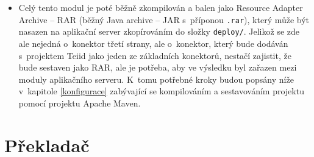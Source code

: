 \documentclass[oneside,12pt]{fithesis2}
\begin{document}
\begin{itemize}
 \texttt{MANIFEST.MF} obsahuje pouze závislosti resource adapteru. V~případě našeho konkrétního adapteru je to:
 \begin{Verbatim}[fontsize=\small]
Dependencies: org.jboss.teiid.common-core,
	    org.jboss.teiid.api,javax.api,
	    org.jboss.teiid.translator.simpledb.api
 \end{Verbatim}
 
 V~deployment descriptoru \texttt{ra.xml} definujeme hlavní třídu resource adapteru (tj. třída implementující rozhraní \texttt{Resource Adapter}), třídu implementující rozhraní \texttt{ManagedConnection\allowbreak Factory} a definujeme proměnné potřebné k~připojení k~SimpleDB (ID přístupového klíče a tajný klíč). 
 
 \item Celý tento modul je poté běžně zkompilován a balen jako Resource Adapter Archive -- RAR (běžný Java archive -- JAR s~příponou \texttt{.rar}), který může být nasazen na aplikační server zkopírováním do složky \texttt{deploy/}. Jelikož se zde ale nejedná o~konektor třetí strany, ale o~konektor, který bude dodáván s~projektem Teiid jako jeden ze základních konektorů, nestačí zajistit, že bude sestaven jako RAR, ale je potřeba, aby ve výsledku byl zařazen mezi moduly aplikačního serveru. K~tomu potřebné kroky budou popsány níže v~kapitole \ref{konfigurace} zabývající se kompilováním a sestavováním projektu pomocí projektu Apache Maven.
\end{itemize}

\section{Překladač}
\end{document}
